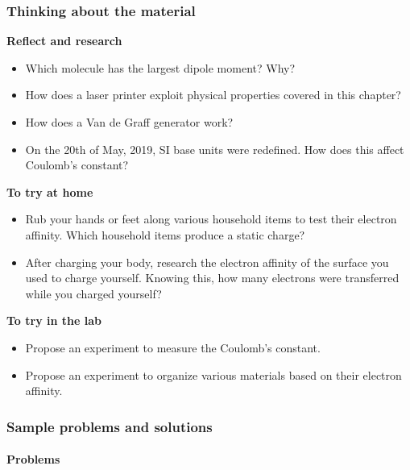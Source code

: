 \subsubsection{Thinking about the material}

\begin{framed}
\textbf{Reflect and research}\\
\begin{itemize}
\item Which molecule has the largest dipole moment? Why?
\item How does a laser printer exploit physical properties covered in this chapter?
\item How does a Van de Graff generator work?
\item On the 20th of May, 2019, SI base units were redefined. How does this affect Coulomb's constant?
\end{itemize}
\end{framed}

\begin{framed}
\textbf{To try at home}\\
\begin{itemize}
\item Rub your hands or feet along various household items to test their electron affinity. Which household items produce a static charge?
\item After charging your body, research the electron affinity of the surface you used to charge yourself. Knowing this, how many electrons were transferred while you charged yourself?
\end{itemize}
\end{framed}

\begin{framed}
\textbf{To try in the lab}\\
\begin{itemize}
\item Propose an experiment to measure the Coulomb's constant.
\item Propose an experiment to organize various materials based on their electron affinity.
\end{itemize}
\end{framed}

\subsubsection{Sample problems and solutions}

\paragraph{Problems}

